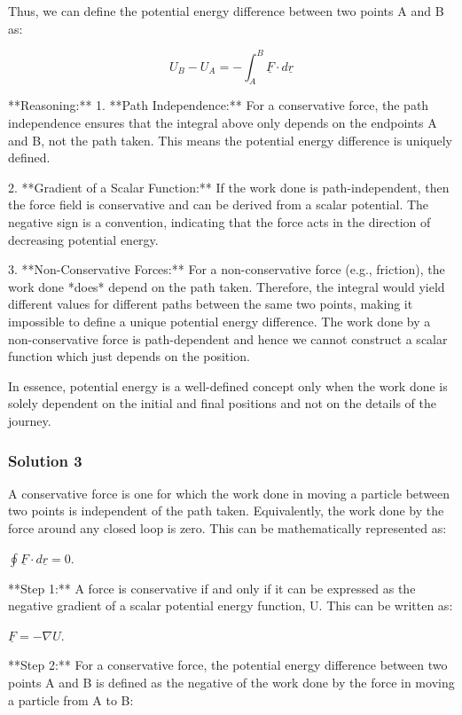 \documentclass{article}
\begin{document}
Thus, we can define the potential energy difference between two points A and B as:

\begin{equation}
U_B - U_A = -\int_A^B \underline{F} \cdot d\underline{r}
\end{equation}

**Reasoning:**
1. **Path Independence:** For a conservative force, the path independence ensures that the integral above only depends on the endpoints A and B, not the path taken. This means the potential energy difference is uniquely defined.

2. **Gradient of a Scalar Function:** If the work done is path-independent, then the force field is conservative and can be derived from a scalar potential. The negative sign is a convention, indicating that the force acts in the direction of decreasing potential energy.

3. **Non-Conservative Forces:** For a non-conservative force (e.g., friction), the work done *does* depend on the path taken. Therefore, the integral would yield different values for different paths between the same two points, making it impossible to define a unique potential energy difference. The work done by a non-conservative force is path-dependent and hence we cannot construct a scalar function which just depends on the position.

In essence, potential energy is a well-defined concept only when the work done is solely dependent on the initial and final positions and not on the details of the journey.

\subsubsection{Solution 3}

A conservative force is one for which the work done in moving a particle between two points is independent of the path taken. Equivalently, the work done by the force around any closed loop is zero. This can be mathematically represented as:

$\oint \underline{F} \cdot d\underline{r} = 0$.

**Step 1:**  A force is conservative if and only if it can be expressed as the negative gradient of a scalar potential energy function, U.
This can be written as:

$\underline{F} = -\nabla U$.

**Step 2:** For a conservative force, the potential energy difference between two points A and B is defined as the negative of the work done by the force in moving a particle from A to B:
\end{document}
